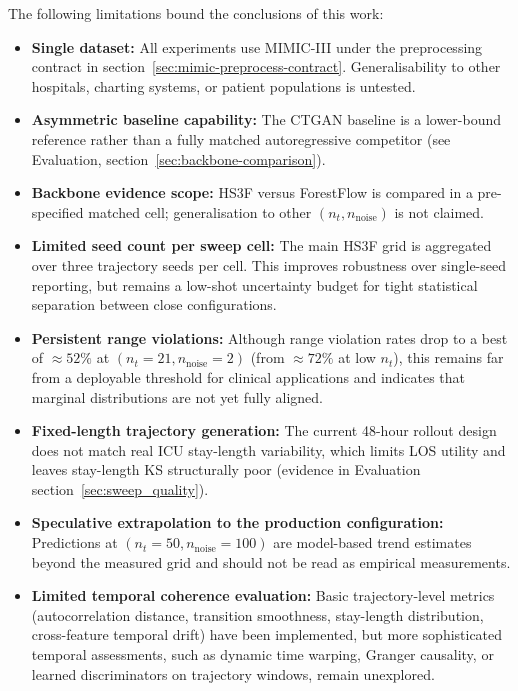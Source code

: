 The following limitations bound the conclusions of this work:
\begin{itemize}\tightlist
    \item \textbf{Single dataset:} All experiments use MIMIC-III under the preprocessing contract in section~\ref{sec:mimic-preprocess-contract}. Generalisability to other hospitals, charting systems, or patient populations is untested.
    \item \textbf{Asymmetric baseline capability:} The CTGAN baseline is a lower-bound reference rather than a fully matched autoregressive competitor (see Evaluation, section~\ref{sec:backbone-comparison}).
    \item \textbf{Backbone evidence scope:} HS3F versus ForestFlow is compared in a pre-specified matched cell; generalisation to other $(n_t, n_{\text{noise}})$ is not claimed.
    \item \textbf{Limited seed count per sweep cell:} The main HS3F grid is aggregated over three trajectory seeds per cell. This improves robustness over single-seed reporting, but remains a low-shot uncertainty budget for tight statistical separation between close configurations.
    \item \textbf{Persistent range violations:} Although range violation rates drop to a best of $\approx 52\%$ at $(n_t{=}21, n_{\text{noise}}{=}2)$ (from $\approx 72\%$ at low $n_t$), this remains far from a deployable threshold for clinical applications and indicates that marginal distributions are not yet fully aligned.
    \item \textbf{Fixed-length trajectory generation:} The current 48-hour rollout design does not match real ICU stay-length variability, which limits LOS utility and leaves stay-length KS structurally poor (evidence in Evaluation section~\ref{sec:sweep_quality}).
    \item \textbf{Speculative extrapolation to the production configuration:} Predictions at $(n_t{=}50, n_{\text{noise}}{=}100)$ are model-based trend estimates beyond the measured grid and should not be read as empirical measurements.
    \item \textbf{Limited temporal coherence evaluation:} Basic trajectory-level metrics (autocorrelation distance, transition smoothness, stay-length distribution, cross-feature temporal drift) have been implemented, but more sophisticated temporal assessments, such as dynamic time warping, Granger causality, or learned discriminators on trajectory windows, remain unexplored.
\end{itemize}

